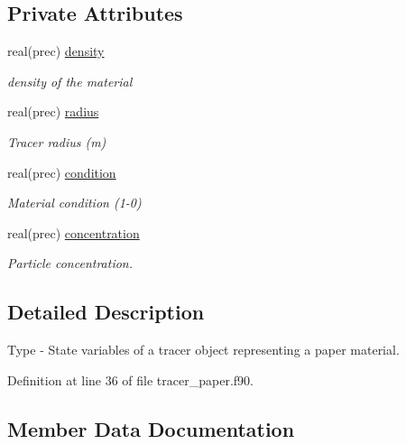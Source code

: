 \subsection*{Private Attributes}
\begin{DoxyCompactItemize}
\item 
real(prec) \mbox{\hyperlink{structtracer__paper__mod_1_1paper__state__class_a52ea928258826e92f35119aa62021cbe}{density}}
\begin{DoxyCompactList}\small\item\em density of the material \end{DoxyCompactList}\item 
real(prec) \mbox{\hyperlink{structtracer__paper__mod_1_1paper__state__class_ac70463dad7537b4e18c6719e975a2a80}{radius}}
\begin{DoxyCompactList}\small\item\em Tracer radius (m) \end{DoxyCompactList}\item 
real(prec) \mbox{\hyperlink{structtracer__paper__mod_1_1paper__state__class_ad0c61709a67ed482b8f8dadb071c78a4}{condition}}
\begin{DoxyCompactList}\small\item\em Material condition (1-\/0) \end{DoxyCompactList}\item 
real(prec) \mbox{\hyperlink{structtracer__paper__mod_1_1paper__state__class_a6643de9258f8017d8ac1910f0b97541c}{concentration}}
\begin{DoxyCompactList}\small\item\em Particle concentration. \end{DoxyCompactList}\end{DoxyCompactItemize}


\subsection{Detailed Description}
Type -\/ State variables of a tracer object representing a paper material. 

Definition at line 36 of file tracer\+\_\+paper.\+f90.



\subsection{Member Data Documentation}
\mbox{\label{structtracer__paper__mod_1_1paper__state__class_a6643de9258f8017d8ac1910f0b97541c}} 
